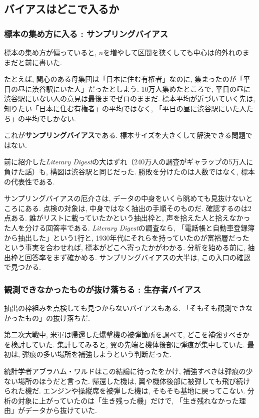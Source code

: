 \subsection{バイアスはどこで入るか}

\subsubsection*{標本の集め方に入る : サンプリングバイアス}

標本の集め方が偏っていると, $n$を増やして区間を狭くしても中心は的外れのままだと前に書いた.

たとえば, 関心のある母集団は「日本に住む有権者」なのに, 集まったのが「平日の昼に渋谷駅にいた人」だったとしよう.
10万人集めたところで, 平日の昼に渋谷駅にいない人の意見は最後までゼロのままだ.
標本平均が近づいていく先は, 知りたい「日本に住む有権者」の平均ではなく, 「平日の昼に渋谷駅にいた人たち」の平均でしかない.

これが\textbf{サンプリングバイアス}である.
標本サイズを大きくして解決できる問題ではない.

前に紹介した\textit{Literary Digest}の大はずれ（240万人の調査がギャラップの5万人に負けた話）も, 構図は渋谷駅と同じだった.
勝敗を分けたのは人数ではなく, 標本の代表性である.

サンプリングバイアスの厄介さは, データの中身をいくら眺めても見抜けないところにある.
点検の対象は, 中身ではなく抽出の手順そのものだ.
確認するのは2点ある. 誰がリストに載っていたかという抽出枠と, 声を拾えた人と拾えなかった人を分ける回答率である.
\textit{Literary Digest}の調査なら, 「電話帳と自動車登録簿から抽出した」という1行と, 1930年代にそれらを持っていたのが富裕層だったという事実を合わせれば, 標本がどこへ寄ったかがわかる.
分析を始める前に, 抽出枠と回答率をまず確かめる. サンプリングバイアスの大半は, この入口の確認で見つかる.

\subsubsection*{観測できなかったものが抜け落ちる : 生存者バイアス}

抽出の枠組みを点検しても見つからないバイアスもある.
「そもそも観測できなかったもの」の抜け落ちだ.

第二次大戦中, 米軍は帰還した爆撃機の被弾箇所を調べて, どこを補強すべきかを検討していた.
集計してみると, 翼の先端と機体後部に弾痕が集中していた.
最初は, 弾痕の多い場所を補強しようという判断だった.

統計学者アブラハム・ワルドはこの結論に待ったをかけ, 補強すべきは弾痕の少ない場所のほうだと言った.
帰還した機は, 翼や機体後部に被弾しても飛び続けられた機だ.
エンジンや操縦席を被弾した機は, そもそも基地に戻ってこない.
分析の対象に上がっていたのは「生き残った機」だけで, 「生き残れなかった理由」がデータから抜けていた.

